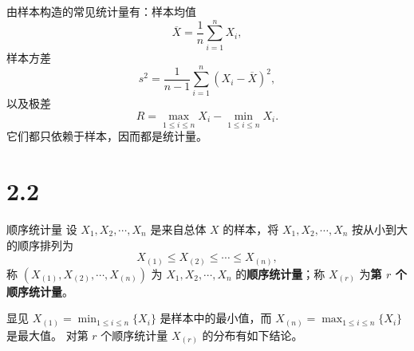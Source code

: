 \begin{definition}[常见统计量]
由样本构造的常见统计量有：样本均值
\[
\overline{X}=\frac{1}{n}\sum_{i=1}^n X_i,
\]
样本方差
\[
s^2=\frac{1}{n-1}\sum_{i=1}^n (X_i-\overline{X})^2,
\]
以及极差
\[
R=\max_{1\le i\le n}X_i-\min_{1\le i\le n}X_i.
\]
它们都只依赖于样本，因而都是统计量。
\end{definition}
\section*{2.2}
\begin{definition}{顺序统计量}
    设 $X_1, X_2, \cdots, X_n$ 是来自总体 $X$ 的样本，将 $X_1, X_2, \cdots, X_n$ 按从小到大的顺序排列为
    \[ X_{(1)} \leqslant X_{(2)} \leqslant \cdots \leqslant X_{(n)}, \]
    称 $(X_{(1)}, X_{(2)}, \cdots, X_{(n)})$ 为 $X_1, X_2, \cdots, X_n$ 的\textbf{顺序统计量}；称 $X_{(r)}$ 为\textbf{第 $r$ 个顺序统计量}。
    
    显见 $X_{(1)} = \min_{1 \leqslant i \leqslant n} \{X_i\}$ 是样本中的最小值，而 $X_{(n)} = \max_{1 \leqslant i \leqslant n} \{X_i\}$ 是最大值。
    对第 $r$ 个顺序统计量 $X_{(r)}$ 的分布有如下结论。
\end{definition}
